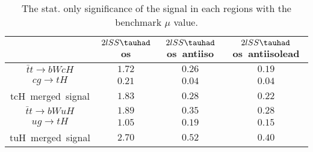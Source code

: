 \begin{table}
\footnotesize
\caption{The stat. only significance of the signal in each regions with the benchmark $\mu$ value.}
\centering
\begin{tabular}{|c|c|c|c|} \hline
 & $2lSS\tauhad$ os & $2lSS\tauhad$ os~antiiso & $2lSS\tauhad$ os~antiisolead\\\hline
$\bar{t}t\to bWcH$ & $1.72$ & $0.26$ & $0.19$\\\hline
$cg\to tH$ & $0.21$ & $0.04$ & $0.04$\\\hline
tcH~merged~signal & $1.83$ & $0.28$ & $0.22$\\\hline
$\bar{t}t\to bWuH$ & $1.89$ & $0.35$ & $0.28$\\\hline
$ug\to tH$ & $1.05$ & $0.19$ & $0.15$\\\hline
tuH~merged~signal & $2.70$ & $0.52$ & $0.40$\\\hline
\end{tabular}
\label{tab:significance}
\end{table}
